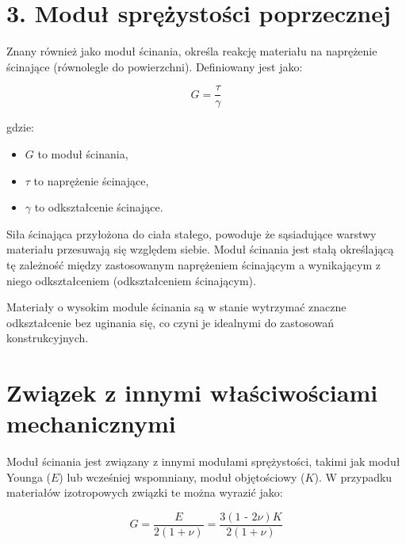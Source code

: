 {}
\justify
\fontsize{14}{16}\selectfont
\setlength{\parindent}{0pt}
\section*{3. Moduł sprężystości poprzecznej \cite{alma991001031769708832}} 
\fontsize{12}{14}\selectfont

\hspace{1.5cm} Znany również jako moduł ścinania, określa reakcję materiału na naprężenie ścinające (równolegle do powierzchni).
Definiowany jest jako:

$$
G = \frac{\tau}{\gamma}
$$

gdzie:
\begin{itemize}
  \item $G$ to moduł ścinania,
  \item $\tau$ to naprężenie ścinające,
  \item $\gamma$ to odkształcenie ścinające.
\end{itemize}

\hspace{1.5cm} Siła ścinająca przyłożona do ciała stałego, powoduje że sąsiadujące warstwy materiału przesuwają się względem siebie. Moduł ścinania jest stałą określającą tę zależność między zastosowanym naprężeniem ścinającym a wynikającym z niego odkształceniem (odkształceniem ścinającym).

Materiały o wysokim module ścinania są w stanie wytrzymać znaczne odkształcenie bez uginania się, co czyni je idealnymi do zastosowań konstrukcyjnych.

{}
\section*{Związek z innymi właściwościami mechanicznymi \cite{alma991000386409708832}}
\vspace{-1.0em}

\hspace{1.5cm} Moduł ścinania jest związany z innymi modułami sprężystości, takimi jak moduł Younga ($E$) lub wcześniej wspomniany, moduł objętościowy ($K$). W przypadku materiałów izotropowych związki te można wyrazić jako:

$$
G = \frac{E}{2(1 + \nu)} = \frac{3(1 \text{ - } 2\nu)K}{2(1 + \nu)}
$$

